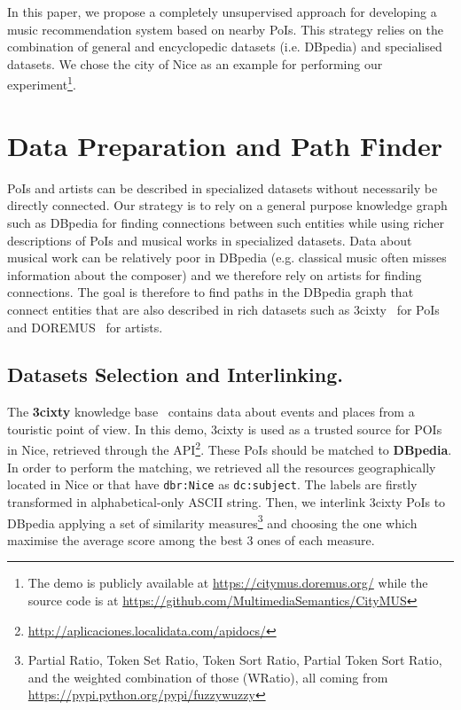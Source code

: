 \documentclass{llncs}
\begin{document}
In this paper, we propose a completely unsupervised approach for developing a music recommendation system based on nearby PoIs. This strategy relies on the combination of general and encyclopedic datasets (i.e. DBpedia) and specialised datasets. We chose the city of Nice as an example for performing our experiment\footnote{The demo is publicly available at \url{https://citymus.doremus.org/} while the source code is at \url{https://github.com/MultimediaSemantics/CityMUS}}.


\section{Data Preparation and Path Finder}
\label{sec:data-processing}
PoIs and artists can be described in specialized datasets without necessarily be directly connected. Our strategy is to rely on a general purpose knowledge graph such as DBpedia for finding connections between such entities while using richer descriptions of PoIs and musical works in specialized datasets. Data about musical work can be relatively poor in DBpedia (e.g. classical music often misses information about the composer) and we therefore rely on artists for finding connections. The goal is therefore to find paths in the DBpedia graph that connect entities that are also described in rich datasets such as 3cixty~\cite{troncy20173cixty} for PoIs and DOREMUS~\cite{achichi2015doremus} for artists.

\subsection*{Datasets Selection and Interlinking.}
The \textbf{3cixty} knowledge base~\cite{troncy20173cixty} contains data about events and places from a touristic point of view. In this demo, 3cixty is used as a trusted source for POIs in Nice, retrieved through the API\footnote{\url{http://aplicaciones.localidata.com/apidocs/}}. These PoIs should be matched to \textbf{DBpedia}. In order to perform the matching, we retrieved all the resources geographically located in Nice or that have \texttt{dbr:Nice} as \texttt{dc:subject}. The labels are firstly transformed in alphabetical-only ASCII string. Then, we interlink 3cixty PoIs to DBpedia applying a set of similarity measures\footnote{Partial Ratio, Token Set Ratio, Token Sort Ratio, Partial Token Sort Ratio, and the weighted combination of those (WRatio), all coming from \url{https://pypi.python.org/pypi/fuzzywuzzy}} and choosing the one which maximise the average score among the best 3 ones of each measure.
\end{document}
